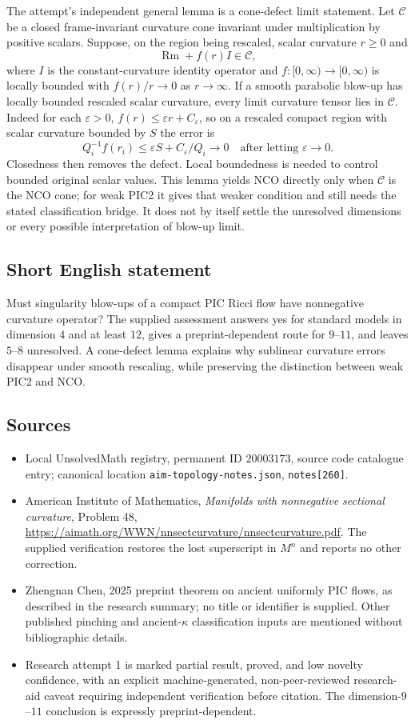 \documentclass[11pt]{article}
\newcommand{\eps}{\varepsilon}
\begin{document}
The attempt's independent general lemma is a cone-defect limit statement. Let $\mathcal C$ be a closed frame-invariant curvature cone invariant under multiplication by positive scalars. Suppose, on the region being rescaled, scalar curvature $r\geq0$ and
\[
 \operatorname{Rm}+f(r)I\in\mathcal C,
\]
where $I$ is the constant-curvature identity operator and $f:[0,\infty)\to[0,\infty)$ is locally bounded with $f(r)/r\to0$ as $r\to\infty$. If a smooth parabolic blow-up has locally bounded rescaled scalar curvature, every limit curvature tensor lies in $\mathcal C$. Indeed for each $\eps>0$, $f(r)\leq\eps r+C_\eps$, so on a rescaled compact region with scalar curvature bounded by $S$ the error is
\[
 Q_i^{-1}f(r_i)\leq\eps S+C_\eps/Q_i\longrightarrow0
 \quad\text{after letting }\eps\to0.
\]
Closedness then removes the defect. Local boundedness is needed to control bounded original scalar values. This lemma yields NCO directly only when $\mathcal C$ is the NCO cone; for weak PIC2 it gives that weaker condition and still needs the stated classification bridge. It does not by itself settle the unresolved dimensions or every possible interpretation of blow-up limit.
\subsection{Short English statement}
Must singularity blow-ups of a compact PIC Ricci flow have nonnegative curvature operator? The supplied assessment answers yes for standard models in dimension $4$ and at least $12$, gives a preprint-dependent route for $9$--$11$, and leaves $5$--$8$ unresolved. A cone-defect lemma explains why sublinear curvature errors disappear under smooth rescaling, while preserving the distinction between weak PIC2 and NCO.
\subsection{Sources}
\begin{itemize}
\item Local UnsolvedMath registry, permanent ID $20003173$, source code catalogue entry; canonical location \texttt{aim-topology-notes.json}, \texttt{notes[260]}.
\item American Institute of Mathematics, \emph{Manifolds with nonnegative sectional curvature}, Problem 48, \url{https://aimath.org/WWN/nnsectcurvature/nnsectcurvature.pdf}. The supplied verification restores the lost superscript in $M^n$ and reports no other correction.
\item Zhengnan Chen, 2025 preprint theorem on ancient uniformly PIC flows, as described in the research summary; no title or identifier is supplied. Other published pinching and ancient-$\kappa$ classification inputs are mentioned without bibliographic details.
\item Research attempt 1 is marked partial result, proved, and low novelty confidence, with an explicit machine-generated, non-peer-reviewed research-aid caveat requiring independent verification before citation. The dimension-$9$--$11$ conclusion is expressly preprint-dependent.
\end{itemize}
\end{document}
